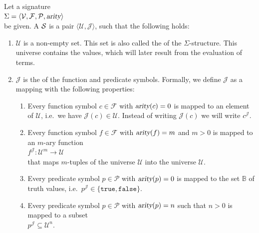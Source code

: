 \begin{Definition}[Structure]
    Let a signature \\[0.2cm]
    \hspace*{1.3cm} $\Sigma = \langle \mathcal{V}, \mathcal{F}, \mathcal{P}, \textsl{arity} \rangle$ \\[0.2cm]
    be given. A  $\mathcal{S}$ is a
    pair $\langle \mathcal{U}, \mathcal{J} \rangle$, such that the following holds:
    \begin{enumerate}
        \item $\mathcal{U}$ is a non-empty set. This set is also called the
                of the $\Sigma$-structure. This universe contains the values,
              which will later result from the evaluation of terms.
        \item $\mathcal{J}$ is the   of the function and predicate symbols.
              Formally, we define $\mathcal{J}$ as a mapping with the following properties:
        \begin{enumerate}
        \item Every function symbol $c \in \mathcal{F}$ with $\textsl{arity}(c) = 0$ is mapped to an element
              of $\mathcal{U}$, i.e.~we have $\mathcal{J}(c) \in \mathcal{U}$.  Instead of writing
              $\mathcal{J}(c)$ we will write $c^{\mathcal{J}}$.
        \item Every function symbol $f \in \mathcal{F}$ with $\textsl{arity}(f) = m$ and $m > 0$ is mapped to
              an $m$-ary function \\[0.2cm]
              \hspace*{1.3cm}
              $f^\mathcal{J}\colon \mathcal{U}^m \rightarrow \mathcal{U}$ \\[0.2cm]
              that maps $m$-tuples of the universe $\mathcal{U}$ into the universe $\mathcal{U}$.
        \item Every predicate symbol $p \in \mathcal{P}$ with $\textsl{arity}(p) = 0$ is mapped to
              the set $\mathbb{B}$ of truth values, i.e.~$p^{\mathcal{J}} \in \{ \mathtt{true}, \mathtt{false}\}$.
        \item Every predicate symbol $p \in \mathcal{P}$ with $\textsl{arity}(p) = n$ such that $n > 0$ is mapped to
              a subset \\[0.2cm]
              \hspace*{1.3cm} 
              $p^\mathcal{J} \subseteq \mathcal{U}^n$. \\[0.2cm]

\end{enumerate}
\end{enumerate}
\end{Definition}
